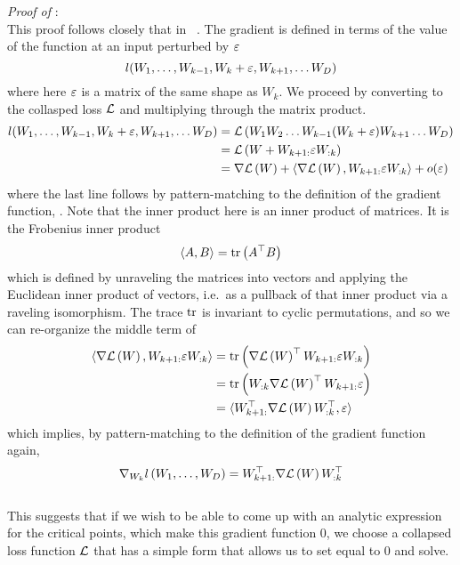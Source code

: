 \documentclass[../../thesis.tex]{subfiles}
\begin{document}
\noindent \emph{Proof of }:\\
This proof follows closely that in%
~\cite{laurent2018}.
The gradient is defined in terms of the value
of the function at an input perturbed by $\varepsilon$
\begin{equation}
	l(W_1, \dots, W_{k-1}, W_k + \varepsilon, W_{k+1}, \dots W_D)
\end{equation}
\noindent where here $\varepsilon$ is a matrix of the same shape as $W_k$.
We proceed by converting to the collasped loss ${\mathcal{L}}$
and multiplying through the matrix product.
\begin{align}
	l(W_1, \dots, W_{k-1}, W_k + \eps, W_{k+1}, \dots W_D)
	&= \cL\left(W_1 W_2 \dots W_{k-1} (W_k + \eps) W_{k+1} \dots W_D\right)\\
	&= \cL\left(W + W_{k+1:} \eps W_{:k}\right)\\
	&= \grad{\cL}{W} + \langle \grad{\cL}{W}, W_{k+1:} \eps W_{:k}\rangle + o(\eps)
	\equationlabel{taylor-collapsed-loss}
\end{align}
\noindent where the last line follows by pattern-matching
to the definition of the gradient function,
.
Note that the inner product here is an inner product of matrices.
It is the Frobenius inner product
\begin{equation}
	\langle A, B \rangle = \mathrm{tr}\left(A^\top B\right)
\end{equation}
\noindent which is defined by unraveling the matrices into vectors
and applying the Euclidean inner product of vectors,
i.e.~as a pullback of that inner product via a raveling isomorphism.
The trace $\mathrm{tr}$ is invariant to cyclic permutations,
and so we can re-organize the middle term of
\begin{align}
	\langle \nabla{\mathcal{L}}\left(W\right), W_{k+1:} \varepsilon W_{:k}\rangle
	&= \mathrm{tr}\left(\nabla{\mathcal{L}}\left(W\right)^\top W_{k+1:} \varepsilon W_{:k} \right)\\
	&= \mathrm{tr}\left(W_{:k} \nabla{\mathcal{L}}\left(W\right)^\top W_{k+1:} \varepsilon \right)\\
	&= \langle W_{k+1:}^\top \nabla{\mathcal{L}}\left(W\right)W_{:k}^\top, \varepsilon\rangle
\end{align}
\noindent which implies, by pattern-matching
to the definition of the gradient function again,
\begin{equation}
	\nabla_{W_k} l\left(W_1, \dots, W_D\right)
	= W_{k+1:}^\top \nabla{\mathcal{L}}\left(W\right) W_{:k}^\top
\end{equation}
\QED\\

This suggests that if we wish to be able to
come up with an analytic expression for the critical points,
which make this gradient function $0$,
we choose a collapsed loss function ${\mathcal{L}}$
that has a simple form that allows us to set
 equal to $0$ and solve.
\end{document}
